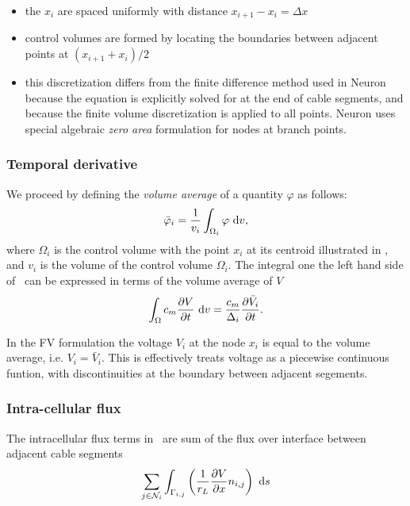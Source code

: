\begin{itemize}
    \item   the $x_i$ are spaced uniformly with distance $x_{i+1}-x_{i} = \Delta x$
    \item   control volumes are formed by locating the boundaries between adjacent points at $(x_{i+1}+x_{i})/2$
    \item   this discretization differs from the finite difference method used in Neuron because the equation is explicitly solved for at the end of cable segments, and because the finite volume discretization is applied to all points. Neuron uses special algebraic \emph{zero area} formulation for nodes at branch points.
\end{itemize}

\subsubsection{Temporal derivative}
We proceed by defining the \emph{volume average} of a quantity $\varphi$ as follows:
\begin{equation}
    \bar{\varphi}_i = \frac{1}{v_i} \int_{\Omega_i}{\varphi}~\text{d}{v},
\end{equation}
where $\Omega_i$ is the control volume with the point $x_i$ at its centroid illustrated in , and $v_i$ is the volume of the control volume $\Omega_i$.
The integral one the left hand side of~ can be expressed in terms of the volume average of $V$
\begin{equation}
    \int_{\Omega}{c_m \frac{\partial{V}}{\partial{t}} } ~\text{d}{v} = \frac{c_m}{\Delta_i} \frac{\partial{\bar{V}_i}}{\partial{t}}.
    \label{eq:dvdt}
\end{equation}

In the FV formulation the voltage $V_i$ at the node $x_i$ is equal to the volume average, i.e. $V_i=\bar{V}_i$.
This is effectively treats voltage as a piecewise continuous funtion, with discontinuities at the boundary between adjacent segements.

\subsubsection{Intra-cellular flux}
The intracellular flux terms in~ are sum of the flux over interface between adjacent cable segments
\begin{equation}
    \sum_{j\in\mathcal{N}_i} {\int_{\Gamma_{i,j}}  \left( \frac{1}{r_L}\frac{\partial{V}}{\partial{x}} n_{i,j} \right) ~\text{d}{s} }
\end{equation}

